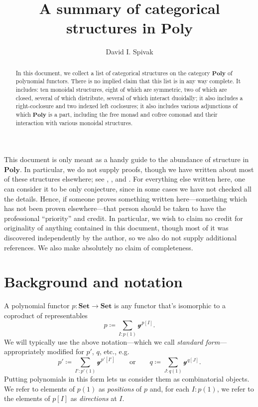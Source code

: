 \documentclass[11pt, one side, article]{memoir}
\theoremstyle{definition}
\theoremstyle{plain}
\newcommand{\Cat}[1]{\mathbf{#1}}%
\newcommand{\smset}{\Cat{Set}}
\newcommand{\yon}{\mathcal{y}}
\newcommand{\poly}{\Cat{Poly}}
\newcommand{\0}{\textsf{0}}
\newcommand{\1}{\tn{\textsf{1}}}
\newcommand{\qqor}{\qquad\text{or}\qquad}
\begin{document}
\title{A summary of categorical structures in $\poly$}

\author{David I. Spivak}


\maketitle

\begin{abstract}
In this document, we collect a list of categorical structures on the category $\poly$ of polynomial functors. There is no implied claim that this list is in any way complete. It includes: ten monoidal structures, eight of which are symmetric, two of which are closed, several of which distribute, several of which interact duoidally; it also includes a right-coclosure and two indexed left coclosures; it also includes various adjunctions of which $\poly$ is a part, including the free monad and cofree comonad and their interaction with various monoidal structures. 
\end{abstract}


\tableofcontents*
\bigskip

This document is only meant as a handy guide to the abundance of structure in $\poly$. In particular, we do not supply proofs, though we have written about most of these structures elsewhere; see \cite{spivak2022poly}, \cite{spivak2021functorial}, and \cite{spivak2022polynomial}. For everything else written here, one can consider it to be only conjecture, since in some cases we have not checked all the details. Hence, if someone proves something written here---something which has not been proven elsewhere---that person should be taken to have the professional ``priority'' and credit. In particular, we wish to claim no credit for originality of anything contained in this document, though most of it was discovered independently by the author, so we also do not supply additional references. We also make absolutely no claim of completeness.

\chapter{Background and notation}

A polynomial functor $p\colon\smset\to\smset$ is any functor that's isomorphic to a coproduct of representables
\[
p\coloneqq\sum_{I: p(1)}\yon^{p[I]}.
\]
We will typically use the above notation---which we call \emph{standard form}---appropriately modified for $p'$, $q$, etc., e.g.
\[
p'\coloneqq\sum_{I': p'(1)}\yon^{p'[I']}
\qqor
q\coloneqq\sum_{J: q(1)}\yon^{q[J]}.
\]
Putting polynomials in this form lets us consider them as combinatorial objects. We refer to elements of $p(1)$ as \emph{positions} of $p$ and, for each $I: p(1)$, we refer to the elements of $p[I]$ as \emph{directions} at $I$. 
\end{document}
